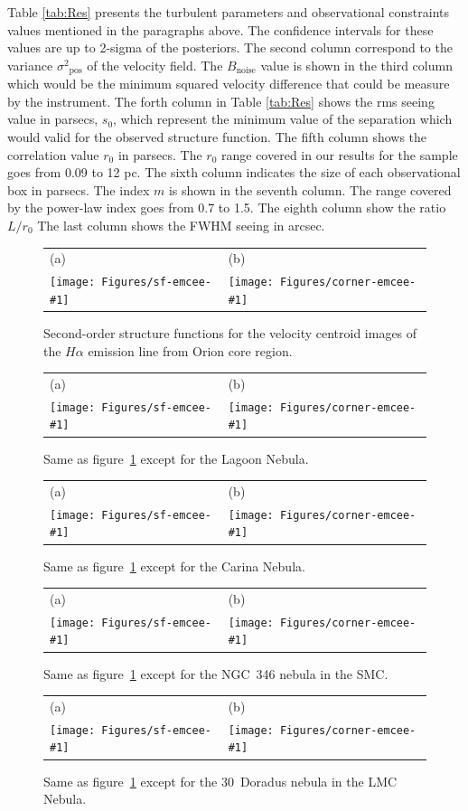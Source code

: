 \documentclass[fleqn,usenatbib, useAMS, a4paper]{mnras}
\newcommand\pos{\ensuremath{_{\mathrm{pos}}}}
\begin{document}
Table \ref{tab:Res} presents the turbulent parameters and observational constraints values mentioned in the paragraphs above.
The confidence intervals for these values are up to 2-sigma of the posteriors.
The second column correspond to the variance \(\sigma^2\pos\) of the velocity field.
The \(B_{\text{noise}}\) value is shown in the third column which would be the minimum squared velocity difference that could be measure by the instrument.
The forth column in Table \ref{tab:Res} shows the rms seeing value in parsecs, \(s_0\), which represent the minimum value of the separation which would valid for the observed structure function. 
The fifth column shows the correlation value \(r_0\) in parsecs.
The \(r_0\) range covered in our results for the sample goes from 0.09 to 12 pc.
The sixth column indicates the size of each observational box in parsecs.
The index \(m\) is shown in the seventh column.
The range covered by the power-law index goes from 0.7 to 1.5.
The eighth column show the ratio \(L / r_0\)
The last column shows the FWHM seeing in arcsec.

\newcommand\sffig[1]{%
  \begin{tabular}{@{}ll@{}}
    (a)& (b)\\
    \texttt{[image: Figures/sf-emcee-\#1]}
       &  \texttt{[image: Figures/corner-emcee-\#1]}
  \end{tabular}%
}

\begin{figure}
  \centering
  \sffig{OrionS}
  \caption{
    Second-order structure functions for the velocity centroid images of the \(H\alpha\) emission line from Orion core region.
  }
  \label{fig:strucfunc-fit-OrionS}
\end{figure}
\begin{figure}
  \centering
  \sffig{M8}
  \caption{
    Same as figure~\ref{fig:strucfunc-fit-OrionS} except for the Lagoon Nebula. 
  }
  \label{fig:strucfunc-fit-M8}
\end{figure}
\begin{figure}
  \centering
  \sffig{CarC}
  \caption{
    Same as figure~\ref{fig:strucfunc-fit-OrionS} except for the Carina Nebula. 
  }
  \label{fig:strucfunc-fit-CarC}
\end{figure}


\begin{figure}
  \centering
  \sffig{N346}
  \caption{
    Same as figure~\ref{fig:strucfunc-fit-OrionS} except for the NGC~346 nebula in the SMC. 
  }
  \label{fig:strucfunc-fit-N346}
\end{figure}
\begin{figure}
  \centering
  \sffig{Dor}
  \caption{
    Same as figure~\ref{fig:strucfunc-fit-OrionS} except for the 30~Doradus nebula in the LMC Nebula. 
  }
  \label{fig:strucfunc-fit-Dor}
\end{figure}
\end{document}
